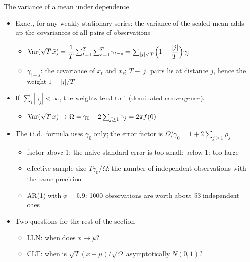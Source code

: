 \begin{frame}{The variance of a mean under dependence}
\itemsize{\small}
\begin{itemize}
    \item Exact, for any weakly stationary series: the variance of the scaled mean adds up the covariances of all pairs of observations
    \begin{itemize}
        \item $\text{Var}(\sqrt{T}\,\bar x) = \dfrac{1}{T}\sum_{t=1}^{T}\sum_{s=1}^{T}\gamma_{t-s} = \sum_{|j| < T}\Big(1 - \dfrac{|j|}{T}\Big)\gamma_j$
        \item $\gamma_{t-s}$: the covariance of $x_t$ and $x_s$; $T - |j|$ pairs lie at distance $j$, hence the weight $1 - |j|/T$
    \end{itemize}
    \item If $\sum_j |\gamma_j| < \infty$, the weights tend to 1 (dominated convergence):
    \begin{itemize}
        \item $\text{Var}(\sqrt{T}\,\bar x) \to \Omega = \gamma_0 + 2\sum_{j\ge 1}\gamma_j = 2\pi f(0)$
    \end{itemize}
    \item The i.i.d.\ formula uses $\gamma_0$ only; the error factor is $\Omega/\gamma_0 = 1 + 2\sum_{j\ge1}\rho_j$
    \begin{itemize}
        \item factor above 1: the naive standard error is too small; below 1: too large
        \item effective sample size $T\gamma_0/\Omega$: the number of independent observations with the same precision
        \item AR(1) with $\phi = 0.9$: 1000 observations are worth about 53 independent ones
    \end{itemize}
    \item Two questions for the rest of the section
    \begin{itemize}
        \item LLN: when does $\bar x \to \mu$?
        \item CLT: when is $\sqrt{T}(\bar x - \mu)/\sqrt{\Omega}$ asymptotically $N(0,1)$?
    \end{itemize}
\end{itemize}
\end{frame}

